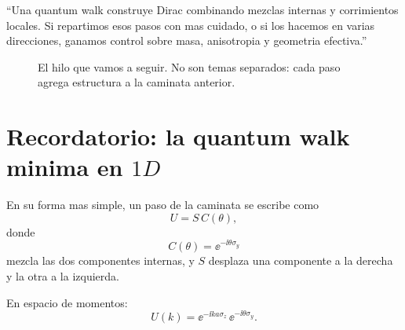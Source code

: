 \begin{displayquote}
\enquote{Una quantum walk construye Dirac combinando mezclas internas y corrimientos locales. Si repartimos esos pasos con mas cuidado, o si los hacemos en varias direcciones, ganamos control sobre masa, anisotropia y geometria efectiva.}
\end{displayquote}

\begin{figure}[ht]
\centering
{}
\caption{El hilo que vamos a seguir. No son temas separados: cada paso agrega estructura a la caminata anterior.}
\label{c04:fig:thread}
\end{figure}

\section{Recordatorio: la quantum walk minima en \(1D\)}

En su forma mas simple, un paso de la caminata se escribe como
\begin{equation}
U=S\,C(\theta),
\end{equation}
donde
\begin{equation}
C(\theta)=\ee^{-\ii\theta\sigma_y}
\end{equation}
mezcla las dos componentes internas, y \(S\) desplaza una componente a la derecha y la otra a la izquierda.

En espacio de momentos:
\begin{equation}
U(k)=\ee^{-\ii ka\sigma_z}\,\ee^{-\ii\theta\sigma_y}.
\end{equation}

